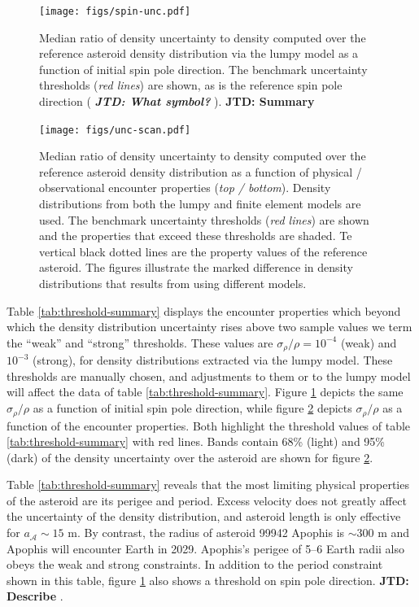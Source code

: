 \documentclass[fleqn,usenatbib]{mnras}
\newcommand{\jtd}[1]{ {\bf{\color{red} JTD: #1}} }
\begin{document}
\begin{figure}
  \centering
  \texttt{[image: figs/spin-unc.pdf]}
  \caption{Median ratio of density uncertainty to density computed over the reference asteroid density distribution via the lumpy model as a function of initial spin pole direction. The benchmark uncertainty thresholds (\textit{red lines}) are shown, as is the reference spin pole direction (\textit{\jtd{What symbol?}}). \jtd{Summary}}
  \label{fig:spin-uncertainty}
\end{figure}

\begin{figure}
  \centering
  \texttt{[image: figs/unc-scan.pdf]}
  \caption{Median ratio of density uncertainty to density computed over the reference asteroid density distribution as a function of physical / observational encounter properties (\textit{top / bottom}). Density distributions from both the lumpy and finite element models are used. The benchmark uncertainty thresholds (\textit{red lines}) are shown and the properties that exceed these thresholds are shaded. Te vertical black dotted lines are the property values of the reference asteroid. The figures illustrate the marked difference in density distributions that results from using different models.}
  \label{fig:net-uncertainty}
\end{figure}

Table \ref{tab:threshold-summary} displays the encounter properties which beyond which the density distribution uncertainty rises above two sample values we term the ``weak'' and ``strong'' thresholds. These values are $\sigma_\rho / \rho = 10^{-4}$ (weak) and $10^{-3}$ (strong), for density distributions extracted via the lumpy model. These thresholds are manually chosen, and adjustments to them or to the lumpy model will affect the data of table \ref{tab:threshold-summary}. Figure \ref{fig:spin-uncertainty} depicts the same $\sigma_\rho / \rho$ as a function of initial spin pole direction, while figure \ref{fig:net-uncertainty} depicts $\sigma_\rho / \rho$ as a function of the encounter properties. Both highlight the threshold values of table \ref{tab:threshold-summary} with red lines. Bands contain 68\% (light) and 95\% (dark) of the density uncertainty over the asteroid are shown for figure \ref{fig:net-uncertainty}.

Table \ref{tab:threshold-summary} reveals that the most limiting physical properties of the asteroid are its perigee and period. Excess velocity does not greatly affect the uncertainty of the density distribution, and asteroid length is only effective for $a_\mathcal{A} \sim 15$ m. By contrast, the radius of asteroid 99942 Apophis is 
$\sim 300$ m and Apophis will encounter Earth in 2029. Apophis's perigee of 5--6 Earth radii also obeys the weak and strong constraints. In addition to the period constraint shown in this table, figure \ref{fig:spin-uncertainty} also shows a threshold on spin pole direction. \jtd{Describe}.
\end{document}
